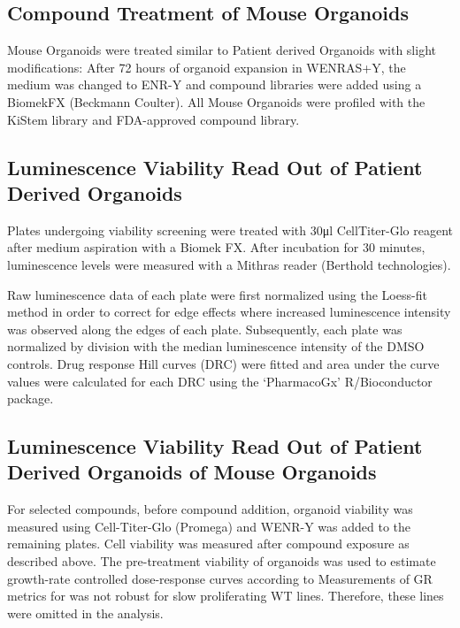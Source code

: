 \begin{flushleft}
\subsection{Compound Treatment of Mouse Organoids}
Mouse Organoids were treated similar to Patient derived Organoids with slight modifications: After 72 hours of organoid expansion in WENRAS+Y, the medium was changed to ENR-Y and compound libraries were added using a BiomekFX (Beckmann Coulter). All Mouse Organoids were profiled with the KiStem library and FDA-approved compound library.

\subsection{Luminescence Viability Read Out of Patient Derived Organoids}
Plates undergoing viability screening were treated with 30μl CellTiter-Glo reagent after medium aspiration with a Biomek FX. After incubation for 30 minutes, luminescence levels were measured with a Mithras reader (Berthold technologies).

Raw luminescence data of each plate were first normalized using the Loess-fit method in order to correct for edge effects where increased luminescence intensity was observed along the edges of each plate. Subsequently, each plate was normalized by division with the median luminescence intensity of the DMSO controls. Drug response Hill curves (DRC) were fitted and area under the curve values were calculated for each DRC using the ‘PharmacoGx’ \cite{Smirnov2016-ah} R/Bioconductor package.

\subsection{Luminescence Viability Read Out of Patient Derived Organoids of Mouse Organoids}
For selected compounds, before compound addition, organoid viability was measured using Cell-Titer-Glo (Promega) and WENR-Y was added to the remaining plates. Cell viability was measured after compound exposure as described above. The pre-treatment viability of organoids was used to estimate growth-rate controlled dose-response curves according to \cite{Hafner2016-yr} Measurements of GR metrics for was not robust for slow proliferating WT lines. Therefore, these lines were omitted in the analysis.


\end{flushleft}
